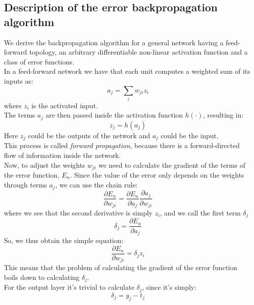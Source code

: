 \documentclass[12pt]{article}
\begin{document}
\subsection{Description of the error backpropagation algorithm}
We derive the backpropagation algorithm for a general network having a feed-forward topology, an 
arbitrary differentiable non-linear activation function and a class of error functions. \\
In a feed-forward network we have that each unit computes a weighted sum of its inputs as:
\begin{equation}
  a_j = \sum_i w_{ji}z_i
\end{equation}
where $z_i$ is the activated input. \\
The terms $a_j$ are then passed inside the activation function $h(\cdot)$, resulting in:
\begin{equation}
  z_j = h(a_j)
\end{equation}
Here $z_j$ could be the outputs of the network and $a_j$ could be the input. \\
This process is called \textit{forward propagation}, because there is a forward-directed flow of
information inside the network. \\
Now, to adjust the weights $w_{ji}$ we need to calculate the gradient of the terms of the error  
function, $E_n$. Since the value of the error only depends on the weights through terms $a_j$, we 
can use the chain rule:
\begin{equation}
  \frac{\partial E_n}{\partial w_{ji}} = 
  \frac{\partial E_n}{\partial a_{j}}\frac{\partial a_j}{\partial w_{ji}}
\end{equation}
where we see that the second derivative is simply $z_i$, and we call the first term $\delta_j$
\begin{equation}
  \delta_j = \frac{\partial E_n}{\partial a_j}
\end{equation}
So, we thus obtain the simple equation:
\begin{equation}
  \frac{\partial E_n}{\partial w_{ji}} = \delta_j z_i
  \label{loss_gradient_weight}
\end{equation}
This means that the problem of calculating the gradient of the error function boils down to
calculating $\delta_j$. \\
For the output layer it's trivial to calculate $\delta_j$, since it's simply:
\begin{equation}
  \delta_j = y_j - t_j
  \label{output_delta}
\end{equation}
\end{document}
